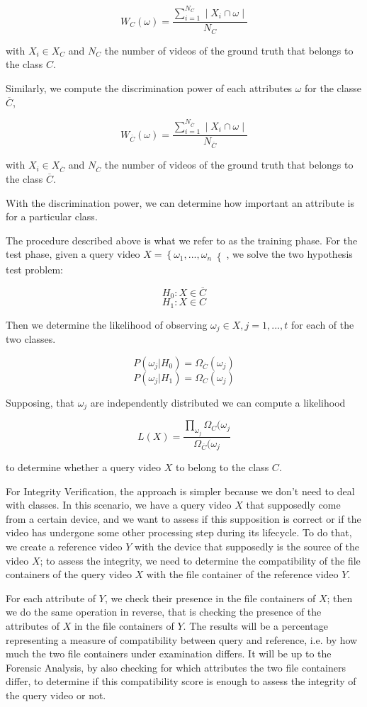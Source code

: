 $$  W_{C}(\omega) = \dfrac{\sum\limits_{i=1}^{N_{C}}\mid X_{i} \cap \omega \mid}{N_{C}} $$

with $X_{i} \in X_{C}$ and $N_{C}$ the number of videos of the ground truth that belongs to the class $C$.

Similarly, we compute the discrimination power of each attributes $\omega$ for the classe $\overline{C}$,

$$  W_{\overline{C}}(\omega) = \dfrac{\sum\limits_{i=1}^{N_{\overline{C}}}\mid X_{i} \cap \omega \mid}{N_{\overline{C}}} $$

with $X_{i} \in X_{\overline{C}}$ and $N_{\overline{C}}$ the number of videos of the ground truth that belongs to the class $\overline{C}$.

With the discrimination power, we can determine how important an attribute is for a particular class.

The procedure described above is what we refer to as the training phase. For the test phase, given a query video $X = \left\lbrace \omega_{1},...,\omega_{n} \right\lbrace $, we solve the two hypothesis test problem:

$$  H_{0}:X \in \overline{C} $$
$$  H_{1}:X \in C $$

Then we determine the likelihood of observing $\omega_{j} \in X, j = 1,...,t$ for each of the two classes.

$$ P(\omega_{j}\vert H_{0}) = \Omega_{\overline{C}}(\omega_{j}) $$
$$ P(\omega_{j}\vert H_{1}) = \Omega_{C}(\omega_{j}) $$ 

Supposing, that $\omega_{j}$ are independently distributed we can compute a likelihood

$$ L(X) = \dfrac{\prod\limits_{\omega_{j}} \Omega_{C}(\omega_{j} }{\Omega_{\overline{C}}(\omega_{j}} $$

to determine whether a query video $X$ to belong to the class $C$.

For Integrity Verification, the approach is simpler because we don't need to deal with classes. In this scenario, we have a query video $X$ that supposedly come from a certain device, and we want to assess if this supposition is correct or if the video has undergone some other processing step during its lifecycle. To do that, we create a reference video $Y$ with the device that supposedly is the source of the video $X$; to assess the integrity, we need to determine the compatibility of the file containers of the query video $X$ with the file container of the reference video $Y$. 

For each attribute of $Y$, we check their presence in the file containers of $X$; then we do the same operation in reverse, that is checking the presence of the attributes of $X$ in the file containers of $Y$. The results will be a percentage representing a measure of compatibility between query and reference, i.e. by how much the two file containers under examination differs. It will be up to the Forensic Analysis, by also checking for which attributes the two file containers differ, to determine if this compatibility score is enough to assess the integrity of the query video or not.

